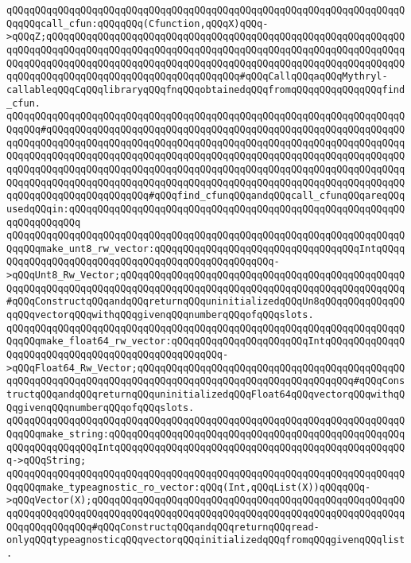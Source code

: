 \verb|qQQqqQQqqQQqqQQqqQQqqQQqqQQqqQQqqQQqqQQqqQQqqQQqqQQqqQQqqQQqqQQqqQQqqQQqqQQqcall_cfun:qQQqqQQq(Cfunction,qQQqX)qQQq->qQQqZ;qQQqqQQqqQQqqQQqqQQqqQQqqQQqqQQqqQQqqQQqqQQqqQQqqQQqqQQqqQQqqQQqqQQqqQQqqQQqqQQqqQQqqQQqqQQqqQQqqQQqqQQqqQQqqQQqqQQqqQQqqQQqqQQqqQQqqQQqqQQqqQQqqQQqqQQqqQQqqQQqqQQqqQQqqQQqqQQqqQQqqQQqqQQqqQQqqQQqqQQqqQQqqQQqqQQqqQQqqQQqqQQqqQQqqQQqqQQqqQQqqQQq#qQQqCallqQQqaqQQqMythryl-callableqQQqCqQQqlibraryqQQqfnqQQqobtainedqQQqfromqQQqqQQqqQQqqQQqfind_cfun.|\newline
\verb|qQQqqQQqqQQqqQQqqQQqqQQqqQQqqQQqqQQqqQQqqQQqqQQqqQQqqQQqqQQqqQQqqQQqqQQqqQQq#qQQqqQQqqQQqqQQqqQQqqQQqqQQqqQQqqQQqqQQqqQQqqQQqqQQqqQQqqQQqqQQqqQQqqQQqqQQqqQQqqQQqqQQqqQQqqQQqqQQqqQQqqQQqqQQqqQQqqQQqqQQqqQQqqQQqqQQqqQQqqQQqqQQqqQQqqQQqqQQqqQQqqQQqqQQqqQQqqQQqqQQqqQQqqQQqqQQqqQQqqQQqqQQqqQQqqQQqqQQqqQQqqQQqqQQqqQQqqQQqqQQqqQQqqQQqqQQqqQQqqQQqqQQqqQQqqQQqqQQqqQQqqQQqqQQqqQQqqQQqqQQqqQQqqQQqqQQqqQQqqQQqqQQqqQQqqQQqqQQqqQQqqQQqqQQqqQQqqQQqqQQqqQQq#qQQqfind_cfunqQQqandqQQqcall_cfunqQQqareqQQqusedqQQqin:qQQqqQQqqQQqqQQqqQQqqQQqqQQqqQQqqQQqqQQqqQQqqQQqqQQqqQQqqQQqqQQqqQQqqQQq|\newline
\verb|qQQqqQQqqQQqqQQqqQQqqQQqqQQqqQQqqQQqqQQqqQQqqQQqqQQqqQQqqQQqqQQqqQQqqQQqqQQqmake_unt8_rw_vector:qQQqqQQqqQQqqQQqqQQqqQQqqQQqqQQqqQQqIntqQQqqQQqqQQqqQQqqQQqqQQqqQQqqQQqqQQqqQQqqQQqqQQqqQQq->qQQqUnt8_Rw_Vector;qQQqqQQqqQQqqQQqqQQqqQQqqQQqqQQqqQQqqQQqqQQqqQQqqQQqqQQqqQQqqQQqqQQqqQQqqQQqqQQqqQQqqQQqqQQqqQQqqQQqqQQqqQQqqQQqqQQqqQQq#qQQqConstructqQQqandqQQqreturnqQQquninitializedqQQqUn8qQQqqQQqqQQqqQQqqQQqvectorqQQqwithqQQqgivenqQQqnumberqQQqofqQQqslots.|\newline
\verb|qQQqqQQqqQQqqQQqqQQqqQQqqQQqqQQqqQQqqQQqqQQqqQQqqQQqqQQqqQQqqQQqqQQqqQQqqQQqmake_float64_rw_vector:qQQqqQQqqQQqqQQqqQQqqQQqIntqQQqqQQqqQQqqQQqqQQqqQQqqQQqqQQqqQQqqQQqqQQqqQQqqQQq->qQQqFloat64_Rw_Vector;qQQqqQQqqQQqqQQqqQQqqQQqqQQqqQQqqQQqqQQqqQQqqQQqqQQqqQQqqQQqqQQqqQQqqQQqqQQqqQQqqQQqqQQqqQQqqQQqqQQqqQQqqQQq#qQQqConstructqQQqandqQQqreturnqQQquninitializedqQQqFloat64qQQqvectorqQQqwithqQQqgivenqQQqnumberqQQqofqQQqslots.|\newline
\verb|qQQqqQQqqQQqqQQqqQQqqQQqqQQqqQQqqQQqqQQqqQQqqQQqqQQqqQQqqQQqqQQqqQQqqQQqqQQqmake_string:qQQqqQQqqQQqqQQqqQQqqQQqqQQqqQQqqQQqqQQqqQQqqQQqqQQqqQQqqQQqqQQqqQQqIntqQQqqQQqqQQqqQQqqQQqqQQqqQQqqQQqqQQqqQQqqQQqqQQqqQQq->qQQqString;|\newline
\verb|qQQqqQQqqQQqqQQqqQQqqQQqqQQqqQQqqQQqqQQqqQQqqQQqqQQqqQQqqQQqqQQqqQQqqQQqqQQqmake_typeagnostic_ro_vector:qQQq(Int,qQQqList(X))qQQqqQQq->qQQqVector(X);qQQqqQQqqQQqqQQqqQQqqQQqqQQqqQQqqQQqqQQqqQQqqQQqqQQqqQQqqQQqqQQqqQQqqQQqqQQqqQQqqQQqqQQqqQQqqQQqqQQqqQQqqQQqqQQqqQQqqQQqqQQqqQQqqQQqqQQqqQQq#qQQqConstructqQQqandqQQqreturnqQQqread-onlyqQQqtypeagnosticqQQqvectorqQQqinitializedqQQqfromqQQqgivenqQQqlist.|\newline
